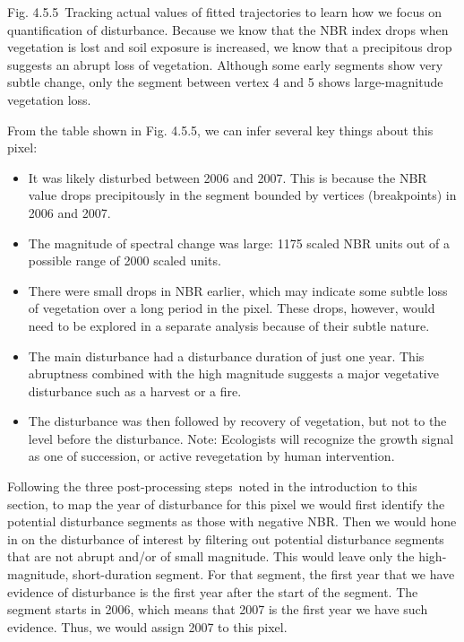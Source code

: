 \documentclass[
  letterpaper,
  DIV=11,
  numbers=noendperiod]{scrreprt}
\providecommand{\tightlist}{%
  \setlength{\itemsep}{0pt}\setlength{\parskip}{0pt}}\usepackage{longtable,booktabs,array}
\begin{document}
Fig. 4.5.5~Tracking actual values of fitted trajectories to learn how we
focus on quantification of disturbance. Because we know that the NBR
index drops when vegetation is lost and soil exposure is increased, we
know that a precipitous drop suggests an abrupt loss of vegetation.
Although some early segments show very subtle change, only the segment
between vertex 4 and 5 shows large-magnitude vegetation loss.

From the table shown in Fig. 4.5.5, we can infer several key things
about this pixel:

\begin{itemize}
\tightlist
\item
  It was likely disturbed between 2006 and 2007. This is because the NBR
  value drops precipitously in the segment bounded by vertices
  (breakpoints) in 2006 and 2007. ~
\item
  The magnitude of spectral change was large: 1175 scaled NBR units out
  of a possible range of 2000 scaled units.
\item
  There were small drops in NBR earlier, which may indicate some subtle
  loss of vegetation over a long period in the pixel. These drops,
  however, would need to be explored in a separate analysis because of
  their subtle nature.
\item
  The main disturbance had a disturbance duration of just one year. This
  abruptness combined with the high magnitude suggests a major
  vegetative disturbance such as a harvest or a fire.
\item
  The disturbance was then followed by recovery of vegetation, but not
  to the level before the disturbance. Note: Ecologists will recognize
  the growth signal as one of succession, or active revegetation by
  human intervention.
\end{itemize}

Following the three post-processing steps~noted in the introduction to
this section, to map the year of disturbance for this pixel we would
first identify the potential disturbance segments as those with negative
NBR. Then we would hone in on the disturbance of interest by filtering
out potential disturbance segments that are not abrupt and/or of small
magnitude. This would leave only the high-magnitude, short-duration
segment. For that segment, the first year that we have evidence of
disturbance is the first year after the start of the segment. The
segment starts in 2006, which means that 2007 is the first year we have
such evidence. Thus, we would assign 2007 to this pixel.
\end{document}
